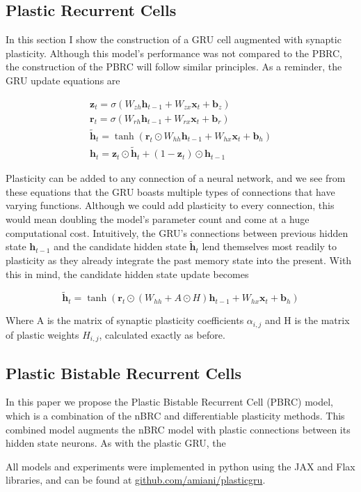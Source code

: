\subsection*{Plastic Recurrent Cells}

In this section I show the construction of a GRU cell augmented with synaptic plasticity. Although this model's performance was not compared to the PBRC, the construction of the PBRC will follow similar principles.
As a reminder, the GRU update equations are

\begin{gather*}
	\mathbf{z}_t = \sigma(W_{zh} \mathbf{h}_{t-1} + W_{zx} \mathbf{x}_t + \mathbf{b}_z)\\
	\mathbf{r}_t = \sigma(W_{rh} \mathbf{h}_{t-1} + W_{rx} \mathbf{x}_t + \mathbf{b}_r)\\
	\mathbf{\tilde{h}}_t = \tanh(\mathbf{r}_t \odot W_{hh} \mathbf{h}_{t-1} + W_{hx} \mathbf{x}_t + \mathbf{b}_h)\\
	\mathbf{h}_t = \mathbf{z}_t \odot \mathbf{\tilde{h}}_t + (1 - \mathbf{z}_t) \odot \mathbf{h}_{t-1}
\end{gather*}

Plasticity can be added to any connection of a neural network, and we see from these equations that the GRU boasts multiple types of connections that have varying functions. Although we could add plasticity to every connection, this would mean doubling the model's parameter count and come at a huge computational cost. Intuitively, the GRU's connections between previous hidden state \(\mathbf{h}_{t-1}\) and the candidate hidden state \(\mathbf{\tilde{h}}_t\) lend themselves most readily to plasticity as they already integrate the past memory state into the present. With this in mind, the candidate hidden state update becomes

\[ \mathbf{\tilde{h}}_t = \tanh(\mathbf{r}_t \odot (W_{hh} + A \odot H) \mathbf{h}_{t-1} + W_{hx} \mathbf{x}_t + \mathbf{b}_h) \]

Where A is the matrix of synaptic plasticity coefficients \(\alpha_{i,j}\) and H is the matrix of plastic weights \(H_{i,j}\), calculated exactly as before.

\subsection*{Plastic Bistable Recurrent Cells}

In this paper we propose the Plastic Bistable Recurrent Cell (PBRC) model, which is a combination of the nBRC and differentiable plasticity methods. This combined model augments the nBRC model with plastic connections between its hidden state neurons. As with the plastic GRU, the 

All models and experiments were implemented in python using the JAX\cite{jax2018github} and Flax\cite{flax2020github} libraries, and can be found at \href{https://github.com/amiani/plasticgru}{github.com/amiani/plasticgru}.
